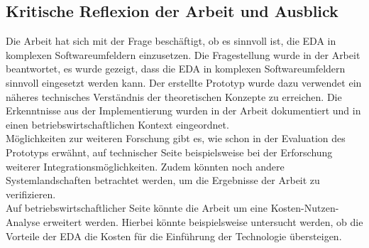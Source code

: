 \subsection{Kritische Reflexion der Arbeit und Ausblick}
Die Arbeit hat sich mit der Frage beschäftigt, ob es sinnvoll ist, die \ac{EDA} in komplexen Softwareumfeldern einzusetzen. Die Fragestellung wurde in der Arbeit beantwortet, es wurde gezeigt, dass die \ac{EDA} in komplexen Softwareumfeldern sinnvoll eingesetzt werden kann. Der erstellte Prototyp wurde dazu verwendet ein näheres technisches Verständnis der theoretischen Konzepte zu erreichen. Die Erkenntnisse aus der Implementierung wurden in der Arbeit dokumentiert und in einen betriebswirtschaftlichen Kontext eingeordnet. \\
Möglichkeiten zur weiteren Forschung gibt es, wie schon in der Evaluation des Prototyps erwähnt, auf technischer Seite beispielsweise bei der Erforschung weiterer Integrationsmöglichkeiten. Zudem könnten noch andere Systemlandschaften betrachtet werden, um die Ergebnisse der Arbeit zu verifizieren. \\
Auf betriebswirtschaftlicher Seite könnte die Arbeit um eine Kosten-Nutzen-Analyse erweitert werden. Hierbei könnte beispielsweise untersucht werden, ob die Vorteile der \ac{EDA} die Kosten für die Einführung der Technologie übersteigen. \\
